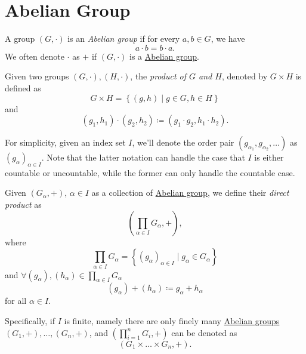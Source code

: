 \section{Abelian Group}
\begin{definition}\label{def:Abelian-group}
	A group \((G, \cdot)\) is an \emph{Abelian group} if for every \(a, b\in G\), we have
	\[
		a\cdot b = b\cdot a.
	\]
	We often denote \(\cdot\) as \(+\) if \((G, \cdot)\) is a \hyperref[def:Abelian-group]{Abelian group}.
\end{definition}

\begin{definition}\label{def:product-of-groups}
	Given two groups \((G, \cdot), (H, \cdot)\), the \emph{product of \(G\) and \(H\)}, denoted by \(G\times H\) is defined as
	\[
		G\times H = \left\{(g, h)\mid g\in G, h\in H\right\}
	\]
	and
	\[
		(g_1, h_1)\cdot (g_2, h_2)\coloneqq (g_1\cdot g_2, h_1\cdot h_2).
	\]
\end{definition}

\begin{notation}
	For simplicity, given an index set \(I\), we'll denote the order pair \((g_{\alpha _1}, g_{\alpha _2}, \dots)\) as \((g_\alpha )_{\alpha \in I}\). Note that
	the latter notation can handle the case that \(I\) is either countable or uncountable, while the former can only handle the countable case.
\end{notation}

\begin{definition}\label{def:direct-product}
	Given \((G_\alpha , +)\), \(\alpha \in I\) as a collection of \hyperref[def:Abelian-group]{Abelian group}, we define their \emph{direct product} as
	\[
		\left(\prod\limits_{\alpha \in I}G_\alpha , + \right),
	\]
	where
	\[
		\prod\limits_{\alpha \in I} G_\alpha = \left\{(g_\alpha )_{\alpha \in I}\mid g_\alpha \in G_\alpha \right\}
	\]
	and \(\forall (g_\alpha ), (h_\alpha )\in \prod\limits_{\alpha \in I} G_\alpha \)
	\[
		(g_\alpha )+(h_\alpha ) \coloneqq g_\alpha + h_\alpha
	\]
	for all \(\alpha \in I\).

	Specifically, if \(I\) is finite, namely there are only finely many \hyperref[def:Abelian-group]{Abelian groups} \((G_1, +),\dots , (G_n, +)\), and
	\(\left(\prod\limits_{i=1}^{n} G_{i} , +\right)\) can be denoted as
	\[
		\left(G_1 \times \dots \times G_n, + \right).
	\]
\end{definition}

